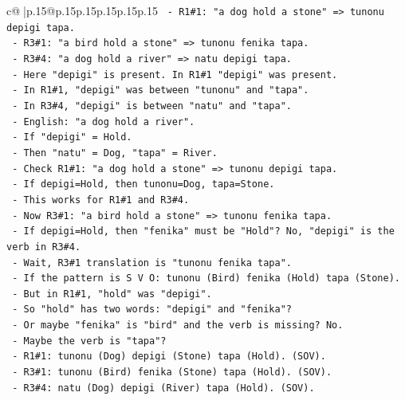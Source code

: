 \documentclass{article}
\begin{document}
{\begin{supertabular}{c@{$\;$}|p{.15\linewidth}@{}p{.15\linewidth}p{.15\linewidth}p{.15\linewidth}p{.15\linewidth}p{.15\linewidth}}
{{{\texttt{        {-} R1\#1: "a dog hold a stone" => tunonu depigi tapa.} \\
\texttt{        {-} R3\#1: "a bird hold a stone" => tunonu fenika tapa.} \\
\texttt{        {-} R3\#4: "a dog hold a river" => natu depigi tapa.} \\
\texttt{          {-} Here "depigi" is present. In R1\#1 "depigi" was present.} \\
\texttt{          {-} In R1\#1, "depigi" was between "tunonu" and "tapa".} \\
\texttt{          {-} In R3\#4, "depigi" is between "natu" and "tapa".} \\
\texttt{          {-} English: "a dog hold a river".} \\
\texttt{          {-} If "depigi" = Hold.} \\
\texttt{          {-} Then "natu" = Dog, "tapa" = River.} \\
\texttt{          {-} Check R1\#1: "a dog hold a stone" => tunonu depigi tapa.} \\
\texttt{            {-} If depigi=Hold, then tunonu=Dog, tapa=Stone.} \\
\texttt{            {-} This works for R1\#1 and R3\#4.} \\
\texttt{            {-} Now R3\#1: "a bird hold a stone" => tunonu fenika tapa.} \\
\texttt{              {-} If depigi=Hold, then "fenika" must be "Hold"? No, "depigi" is the verb in R3\#4.} \\
\texttt{              {-} Wait, R3\#1 translation is "tunonu fenika tapa".} \\
\texttt{              {-} If the pattern is S V O: tunonu (Bird) fenika (Hold) tapa (Stone).} \\
\texttt{              {-} But in R1\#1, "hold" was "depigi".} \\
\texttt{              {-} So "hold" has two words: "depigi" and "fenika"?} \\
\texttt{              {-} Or maybe "fenika" is "bird" and the verb is missing? No.} \\
\texttt{              {-} Maybe the verb is "tapa"?} \\
\texttt{                {-} R1\#1: tunonu (Dog) depigi (Stone) tapa (Hold). (SOV).} \\
\texttt{                {-} R3\#1: tunonu (Bird) fenika (Stone) tapa (Hold). (SOV).} \\
\texttt{                {-} R3\#4: natu (Dog) depigi (River) tapa (Hold). (SOV).} \\
}}}
\end{supertabular}}
\end{document}
